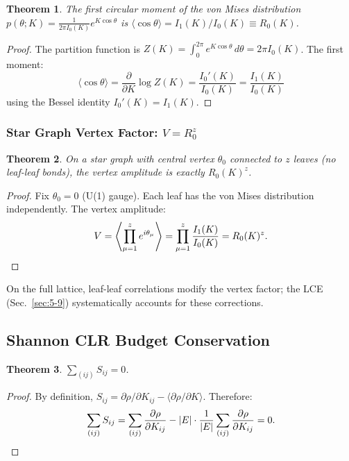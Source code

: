 \documentclass[aps,prd,onecolumn,superscriptaddress,floatfix,12pt]{revtex4-2}
\newcommand{\Rzero}{R_0}
\newtheorem{theorem}{Theorem}[section]
\begin{document}
\begin{theorem}
The first circular moment of the von Mises distribution $p(\theta; K) = \frac{1}{2\pi I_0(K)} e^{K\cos\theta}$ is $\langle \cos\theta \rangle = I_1(K)/I_0(K) \equiv \Rzero(K)$.
\end{theorem}

\begin{proof}
The partition function is $Z(K) = \int_0^{2\pi} e^{K\cos\theta}\,d\theta = 2\pi I_0(K)$. The first moment:
\[
\langle\cos\theta\rangle = \frac{\partial}{\partial K}\log Z(K) = \frac{I_0'(K)}{I_0(K)} = \frac{I_1(K)}{I_0(K)}
\]
using the Bessel identity $I_0'(K) = I_1(K)$.
\end{proof}

\subsubsection{Star Graph Vertex Factor: $V = \Rzero^z$}

\begin{theorem}
On a star graph with central vertex $\theta_0$ connected to $z$ leaves (no leaf-leaf bonds), the vertex amplitude is exactly $\Rzero(K)^z$.
\end{theorem}

\begin{proof}
Fix $\theta_0 = 0$ (U(1) gauge). Each leaf has the von Mises distribution independently. The vertex amplitude:
\[
V = \left\langle\prod_{\mu=1}^z e^{i\theta_\mu}\right\rangle = \prod_{\mu=1}^z \frac{I_1(K)}{I_0(K)} = \Rzero(K)^z.  \qedhere
\]
\end{proof}

On the full lattice, leaf-leaf correlations modify the vertex factor; the LCE (Sec.~\ref{sec:5-9}) systematically accounts for these corrections.

\subsection{Shannon CLR Budget Conservation}\label{sec:A5}

\begin{theorem}
$\sum_{(ij)} S_{ij} = 0$.
\end{theorem}

\begin{proof}
By definition, $S_{ij} = \partial\rho/\partial K_{ij} - \langle\partial\rho/\partial K\rangle$. Therefore:
\[
\sum_{(ij)} S_{ij} = \sum_{(ij)} \frac{\partial\rho}{\partial K_{ij}} - |E| \cdot \frac{1}{|E|}\sum_{(ij)} \frac{\partial\rho}{\partial K_{ij}} = 0.  \qedhere
\]
\end{proof}
\end{document}
